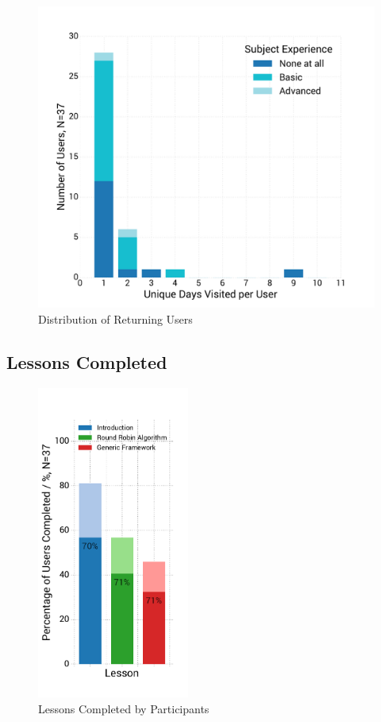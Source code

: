\documentclass[bsc,twoside,singlespacing,parskip,logo,notimes,normalheadings]{infthesis}
\begin{document}
    \begin{figure}[!htb]
      \centering
      \captionsetup{width=\textwidth, justification=centering}
      \caption{Distribution of Returning Users}\label{fig:days-spent}
      \includegraphics[width=.80\textwidth, trim=0 120 0 25]{img/unique_days.pdf}
    \end{figure}

    \subsection{Lessons Completed}

    \begin{figure}
      \centering
      \vspace{-18mm}
      \includegraphics[width=5cm, trim=15 35 35 45, clip]{img/lessons.pdf}
      \captionsetup{width=5cm, justification=centering}
      \caption{Lessons Completed by Participants}\label{fig:lessons-complete}
    \end{figure}
\end{document}
